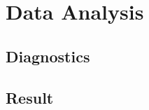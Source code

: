 \documentclass{beamer}
\begin{document}
\section{Data Analysis}

\subsection{Diagnostics} %
\subsection{Result} %

\end{document}
